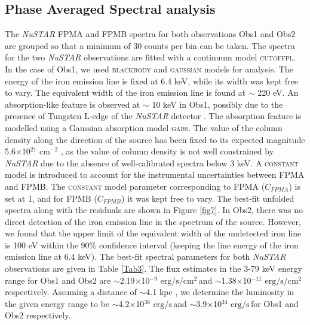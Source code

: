 \documentclass[12pt,a4paper,fleqn,usenatbib]{mnras}
\newcommand{\unitfl}{$\text{erg}/\text{s}/\text{cm}^{2}\,$}
\newcommand{\unilum}{$\text{erg}/\text{s}\,$}
\begin{document}
\subsection{Phase Averaged Spectral analysis}
The \emph{NuSTAR} FPMA and FPMB spectra for both observations Obs1 and Obs2 are grouped so that a minimum of 30 counts per bin can be taken. The spectra for the two \emph{NuSTAR} observations are fitted with a continuum model \textsc{cutoffpl}. In the case of Obs1, we used \textsc{blackbody} and \textsc{gaussian} models for analysis. The energy of the iron emission line is fixed at 6.4 keV, while its width was kept free to vary. The equivalent width of the iron emission line is found at $\sim$ 220 eV. An absorption-like feature is observed at $\sim$ 10 keV in Obs1, possibly due to the presence of Tungsten L-edge of the \emph{NuSTAR} detector \citep{2015ApJS..220....8M}. The absorption feature is modelled using a Gaussian absorption model \textsc{gabs}. The value of the column density along the direction of the source has been fixed to its expected magnitude 5.6$\times$10$^{21}$ cm$^{-2}$ \citep{2016A&A...594A.116H}, as the value of column density is not well constrained by \emph{NuSTAR} due to the absence of well-calibrated spectra below 3 keV. A \textsc{constant} model is introduced to account for the instrumental uncertainties between FPMA and FPMB. The \textsc{constant} model parameter corresponding to FPMA ($C_{FPMA}$) is set at 1, and for FPMB ($C_{FPMB}$) it was kept free to vary. The best-fit unfolded spectra along with the residuals are shown in Figure \ref{fig7}. In Obs2, there was no direct detection of the iron emission line in the spectrum of the source. However, we found that the upper limit of the equivalent width of the undetected iron line is 100 eV within the 90\% confidence interval (keeping the line energy of the iron emission line at 6.4 keV). The best-fit spectral parameters for both \emph{NuSTAR} observations are given in Table \ref{Tab3}. The flux estimates in the 3-79 keV energy range for Obs1 and Obs2 are $\sim$2.19$\times$10$^{-9}$ \unitfl and $\sim$1.38$\times$10$^{-11}$ \unitfl respectively. Assuming a distance of $\sim$4.1 kpc \citep{2022A&A...661A..38P}, we determine the luminosity in the given energy range to be $\sim$4.2$\times$10$^{36}$ \unilum and $\sim$3.9$\times$10$^{34}$ \unilum for Obs1 and Obs2 respectively.
\end{document}
